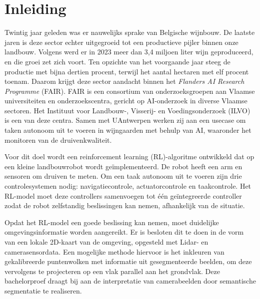 


% 

\section{Inleiding}%
\label{sec:inleiding}

Twintig jaar geleden was er nauwelijks sprake van Belgische wijnbouw. De laatste jaren is deze sector echter uitgegroeid tot een productieve pijler binnen onze landbouw. Volgens \textcite{FODEconomie2024} werd er in 2023 meer dan 3,4 miljoen liter wijn geproduceerd, en die groei zet zich voort. Ten opzichte van het voorgaande jaar steeg de productie met bijna dertien procent, terwijl het aantal hectaren met elf procent toenam. Daarom krijgt deze sector aandacht binnen het \textit{Flanders AI Research Programme} (FAIR). FAIR is een consortium van onderzoeksgroepen aan Vlaamse universiteiten en onderzoekscentra, gericht op AI-onderzoek in diverse Vlaamse sectoren. Het Instituut voor Landbouw-, Visserij- en Voedingsonderzoek (ILVO) is een van deze centra. Samen met UAntwerpen werken zij aan een usecase om taken autonoom uit te voeren in wijngaarden met behulp van AI, waaronder het monitoren van de druivenkwaliteit. 

Voor dit doel wordt een reinforcement learning (RL)-algoritme ontwikkeld dat op een kleine landbouwrobot wordt geïmplementeerd. De robot heeft een arm en sensoren om druiven te meten. Om een taak autonoom uit te voeren zijn drie controlesystemen nodig: navigatiecontrole, actuatorcontrole en taakcontrole. Het RL-model moet deze controllers samenvoegen tot één geïntegreerde controller zodat de robot zelfstandig beslissingen kan nemen, afhankelijk van de situatie.

Opdat het RL-model een goede beslissing kan nemen, moet duidelijke omgevingsinformatie worden aangereikt. Er is besloten dit te doen in de vorm van een lokale 2D-kaart van de omgeving, opgesteld met Lidar- en camerasensordata. Een mogelijke methode hiervoor is het inkleuren van gekalibreerde puntenwolken met informatie uit gesegmenteerde beelden, om deze vervolgens te projecteren op een vlak parallel aan het grondvlak. Deze bachelorproef draagt bij aan de interpretatie van camerabeelden door semantische segmentatie te realiseren.

